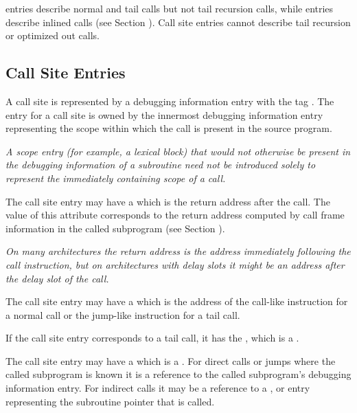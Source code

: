 \DWTAGcallsite{} entries describe normal and tail calls but not tail recursion calls,
while \DWTAGinlinedsubroutine{} entries describe inlined calls 
(see Section ).
\bb
Call site entries cannot describe tail recursion or optimized out calls.
\eb

\bb
\subsection{Call Site Entries}
\label{chap:callsiteentries}
A call site is represented by a debugging information entry with the tag
\DWTAGcallsiteTARG{}. 
The entry for a call site is owned by the innermost
debugging information entry representing the scope within which the
call is present in the source program.

\textit{A scope entry (for example, a lexical block) that would not 
otherwise be present in the debugging information of a subroutine
need not be introduced solely to represent the immediately containing scope
of a call.}
\eb

The call site entry may have a
\DWATcallreturnpcDEFN{}
which is the return address after the call.  
The value of this attribute corresponds to the return address 
computed by call frame information in the called subprogram 
(see Section ).

\textit{On many architectures the return address is the 
address immediately following the call instruction, but 
on architectures with delay slots it might
be an address after the delay slot of the call.}

The call site entry may have a 
\DWATcallpcDEFN{}
 which is the
address of the 
\bb
call-like instruction for a normal call or the jump-like 
instruction for a tail call.
\eb 

If the call site entry corresponds to a tail call, it has the 
\DWATcalltailcallDEFN{}
,
which is a \CLASSflag.

The call site entry may have a 
\DWATcalloriginDEFN{}
which is a \CLASSreference.  For direct calls or jumps where the called 
subprogram is known it is a reference to the called subprogram's debugging
information entry.  For indirect calls it may be a reference to a
\DWTAGvariable{}, \DWTAGformalparameter{} or \DWTAGmember{} entry representing
the subroutine pointer that is called.

